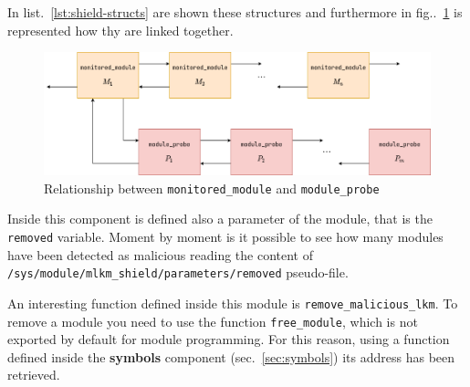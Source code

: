 \documentclass{article}
\begin{document}
	In list.~\ref{lst:shield-structs} are shown these structures and furthermore in fig..~\ref{fig:shield-structs} is
	represented how thy are linked together.

	\begin{figure}[!htbp]
		\centering
		\includegraphics[scale=0.4]{shield-structs}
		\caption{Relationship between \texttt{monitored\_module} and \texttt{module\_probe}}
		\label{fig:shield-structs}
	\end{figure}

	

	Inside this component is defined also a parameter of the module, that is the \texttt{removed} variable. Moment by
	moment is it possible to see how many modules have been detected as malicious reading the content of
	\texttt{/sys/module/mlkm\_shield/parameters/removed} pseudo-file.

	An interesting function defined inside this module is \texttt{remove\_malicious\_lkm}. To remove a module you need
	to use the function \texttt{free\_module}, which is not exported by default for module programming. For this
	reason, using a function defined inside the \textbf{symbols} component (sec.~\ref{sec:symbols}) its address has
	been retrieved.

	
	
\end{document}
